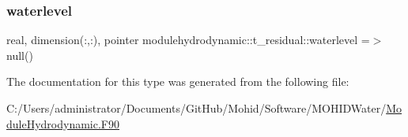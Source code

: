 \mbox{\label{structmodulehydrodynamic_1_1t__residual_a19218bd82cef60693f5834e24ced983a}} 
\subsubsection{\texorpdfstring{waterlevel}{waterlevel}}
{\footnotesize\ttfamily real, dimension(\+:,\+:), pointer modulehydrodynamic\+::t\+\_\+residual\+::waterlevel =$>$ null()\hspace{0.3cm}{\ttfamily [private]}}



The documentation for this type was generated from the following file\+:\begin{DoxyCompactItemize}
\item 
C\+:/\+Users/administrator/\+Documents/\+Git\+Hub/\+Mohid/\+Software/\+M\+O\+H\+I\+D\+Water/\mbox{\hyperlink{_module_hydrodynamic_8_f90}{Module\+Hydrodynamic.\+F90}}\end{DoxyCompactItemize}
